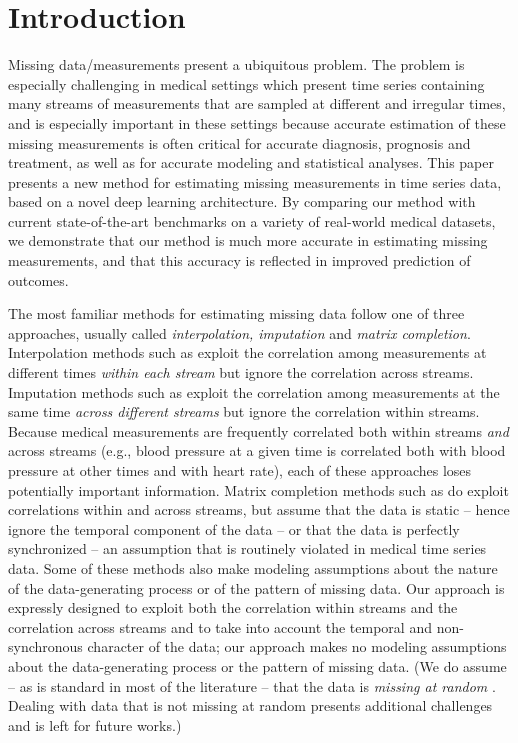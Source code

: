 \documentclass{article}
\begin{document}
   


    \section{Introduction}
Missing data/measurements present a ubiquitous problem. The problem is especially challenging in medical settings which present time series containing many streams of measurements that are sampled at different and  irregular times, and is especially important in these settings because accurate estimation of these missing measurements is often critical for  accurate diagnosis, prognosis and treatment, as well as for accurate modeling and statistical analyses.  This paper presents a new method  for estimating missing measurements in time series data, based on a novel deep learning architecture. By comparing our method with current state-of-the-art benchmarks on a variety of real-world medical datasets, we demonstrate that our method is much more accurate in estimating missing measurements, and that this accuracy is reflected in improved prediction of outcomes.
	
	The most familiar methods for estimating missing data follow one of three approaches, usually called {\em interpolation, imputation} and {\em matrix completion}.  Interpolation methods  such as \cite{interpolation,wavelet} exploit the correlation among measurements at different times {\em within each  stream} but ignore the correlation across streams. Imputation methods such as \cite{Rubin,EM,MICE,missforest} exploit the correlation among measurements at the same time {\em across different  streams} but ignore the correlation within streams.  Because medical measurements are frequently correlated both within streams {\em and} across streams (e.g., blood pressure at a given time is correlated both with blood pressure at other times and with heart rate), each of these approaches loses potentially important information. Matrix completion methods such as \cite{Mat-0,Mat-1,Mat-2,Mat-3} do exploit correlations  within and across streams, but assume that the data is static -- hence ignore the temporal component of the data -- or that the data is perfectly synchronized -- an assumption that is routinely violated in medical time series data.  Some of these methods also  make modeling assumptions about the nature of the data-generating process or of the pattern of missing data. Our approach is expressly designed to exploit both the correlation within streams and the correlation across streams and to take into account the temporal and non-synchronous character of the data; our approach makes no modeling assumptions about the data-generating process or the pattern of missing data. (We do assume -- as is standard in most of the literature -- that the data is {\em missing at random} \cite{Missing_Book}.  Dealing with data that is not missing at random \cite{ICML2017-Alaa} presents additional challenges and is left for future works.)  	
	
\end{document}
